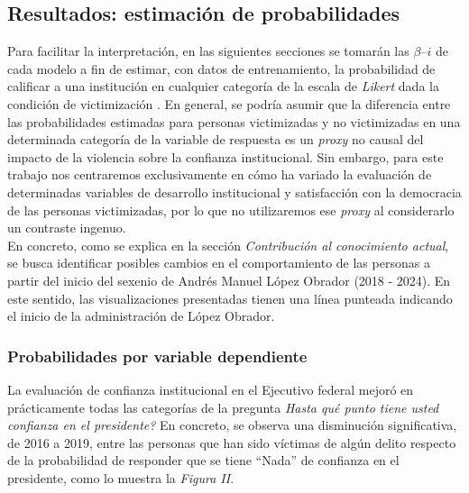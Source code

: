 \documentclass[letterpaper]{article}
\begin{document}
\subsection{Resultados: estimación de probabilidades}

Para facilitar la interpretación, en las siguientes secciones se tomarán las $\beta–i$ de cada modelo a fin de estimar, con datos de entrenamiento, la probabilidad de calificar a una institución en cualquier categoría de la escala de \emph{Likert} dada la condición de victimización \autocite{barlaz2024, McNulty, kurz}. En general, se podría asumir que la diferencia entre las probabilidades estimadas para personas victimizadas y no victimizadas en una determinada categoría de la variable de respuesta es un \emph{proxy} no causal del impacto de la violencia sobre la confianza institucional. Sin embargo, para este trabajo nos centraremos exclusivamente en cómo ha variado la evaluación de determinadas variables de desarrollo institucional y satisfacción con la democracia de las personas victimizadas, por lo que no utilizaremos ese \emph{proxy} al considerarlo un contraste ingenuo.\\[-1.5em] 

En concreto, como se explica en la sección \emph{Contribución al conocimiento actual}, se busca identificar posibles cambios en el comportamiento de las personas a partir del inicio del sexenio de Andrés Manuel López Obrador (2018 - 2024). En este sentido, las visualizaciones presentadas tienen una línea punteada indicando el inicio de la administración de López Obrador.


\subsubsection{Probabilidades por variable dependiente}

La evaluación de confianza institucional en el Ejecutivo federal mejoró en prácticamente todas las categorías de la pregunta \emph{Hasta qué punto tiene usted confianza en el presidente?} En concreto, se observa una disminución significativa, de 2016 a 2019, entre las personas que han sido víctimas de algún delito respecto de la probabilidad de responder que se tiene ``Nada'' de confianza en el presidente, como lo muestra la \emph{Figura II}.\\[-1.5em]
\end{document}

